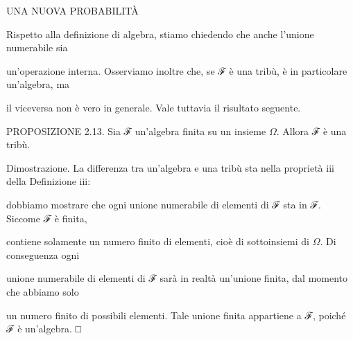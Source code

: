 \documentclass[a4paper,portrait,12pt]{article}
\begin{document}





\begin{flushleft}
UNA NUOVA PROBABILIT\`{A}
\end{flushleft}





\begin{flushleft}
Rispetto alla definizione di algebra, stiamo chiedendo che anche l'unione numerabile sia
\end{flushleft}


\begin{flushleft}
un'operazione interna. Osserviamo inoltre che, se ℱ \`{e} una tribù, \`{e} in particolare un'algebra, ma
\end{flushleft}


\begin{flushleft}
il viceversa non \`{e} vero in generale. Vale tuttavia il risultato seguente.
\end{flushleft}


\begin{flushleft}
PROPOSIZIONE 2.13. Sia ℱ un'algebra finita su un insieme $\Omega$. Allora ℱ \`{e} una tribù.
\end{flushleft}


\begin{flushleft}
Dimostrazione. La differenza tra un'algebra e una tribù sta nella propriet\`{a} iii della Definizione iii:
\end{flushleft}


\begin{flushleft}
dobbiamo mostrare che ogni unione numerabile di elementi di ℱ sta in ℱ. Siccome ℱ \`{e} finita,
\end{flushleft}


\begin{flushleft}
contiene solamente un numero finito di elementi, cio\`{e} di sottoinsiemi di $\Omega$. Di conseguenza ogni
\end{flushleft}


\begin{flushleft}
unione numerabile di elementi di ℱ sar\`{a} in realt\`{a} un'unione finita, dal momento che abbiamo solo
\end{flushleft}


\begin{flushleft}
un numero finito di possibili elementi. Tale unione finita appartiene a ℱ, poich\'{e} ℱ \`{e} un'algebra. □
\end{flushleft}
\end{document}
